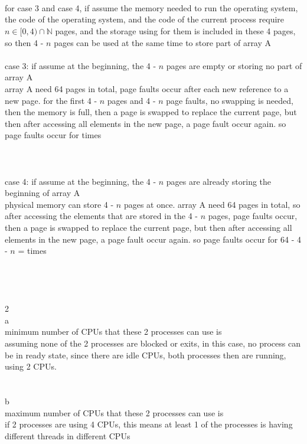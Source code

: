\documentclass[12pt, border = 4pt, multi]{article} %
\begin{document}
\\
\\
\\
for case 3 and case 4, if assume the memory needed to run the operating system, the code of the operating system, and the code of the current process require $n \in [0, 4) \cap \mathbb{N}$ pages, and the storage using for them is included in these 4 pages, so then 4 - $n$ pages can be used at the same time to store part of array A\\
\\
case 3: if assume at the beginning, the 4 - $n$ pages are empty or storing no part of array A\\
array A need 64 pages in total, page faults occur after each new reference to a new page. for the first 4 - $n$ pages and 4 - $n$ page faults, no swapping is needed, then the memory is full, then a page is swapped to replace the current page, but then after accessing all elements in the new page, a page fault occur again. so page faults occur for  times\\ 
\\
\\
\\
case 4: if assume at the beginning, the 4 - $n$ pages are already storing the beginning of array A\\
physical memory can store 4 - $n$ pages at once. array A need 64 pages in total, so after accessing the elements that are stored in the 4 - $n$ pages, page faults occur, then a page is swapped to replace the current page, but then after accessing all elements in the new page, a page fault occur again. so page faults occur for 64 - 4 - $n$ =  times\\
\\
\\
\\
\\
2\\
a\\
minimum number of CPUs that these 2 processes can use is \\
assuming none of the 2 processes are blocked or exits, in this case, no process can be in ready state, since there are idle CPUs, both processes then are running, using 2 CPUs.
\\
\\
\\
b\\
maximum number of CPUs that these 2 processes can use is \\
if 2 processes are using 4 CPUs, this means at least 1 of the processes is having different threads in different CPUs\\
\end{document}
